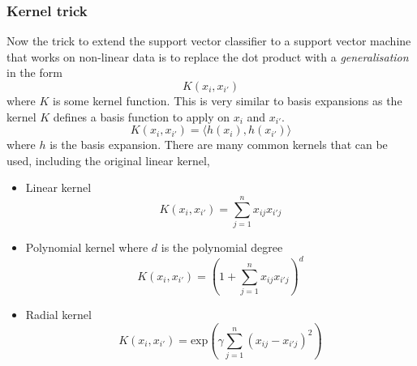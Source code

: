 \documentclass[CS5104-Notes.tex]{subfiles}
\begin{document}
\subsubsection{Kernel trick}
Now the trick to extend the support vector classifier to a support vector machine that works on non-linear data is to replace the dot product with a \textit{generalisation} in the form
\begin{equation}
K(x_{i},x_{i'})
\end{equation}
where $K$ is some kernel function. This is very similar to basis expansions as the kernel $K$ defines a basis function to apply on $x_{i}$ and $x_{i'}$.
\begin{equation}
K(x_{i},x_{i'}) = \langle h(x_{i}),h(x_{i'}) \rangle
\end{equation}
where $h$ is the basis expansion. There are many common kernels that can be used, including the original linear kernel,
\begin{itemize}
\item Linear kernel
  \begin{equation}
    K(x_{i}, x_{i'}) = \sum_{j=1}^{n}x_{ij}x_{i'j}
  \end{equation}
\item Polynomial kernel where $d$ is the polynomial degree
  \begin{equation}
    K(x_{i}, x_{i'}) = (1 + \sum_{j=1}^{n}x_{ij}x_{i'j})^{d}
  \end{equation}
\item Radial kernel
  \begin{equation}
    K(x_{i}, x_{i'}) = \text{exp}(\gamma \sum_{j=1}^{n}(x_{ij} - x_{i'j})^{2})
  \end{equation}
\end{itemize}
\end{document}
